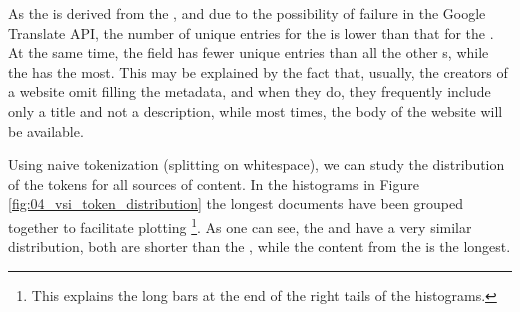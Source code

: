 As the\translationTitle{} is derived from the \translationTitle{}, and due to the possibility of failure in the Google Translate API, the number of unique entries for the \translationTitle{} is lower than that for the \trafilaturaTitle{}.
At the same time, the \trafilaturaAbstract{} field has fewer unique entries than all the other \contentType{}s, while the \trafilaturaFulltext{} has the most. This may be explained by the fact that, usually, the creators of a website omit filling the metadata, and when they do, they frequently include only a title and not a description, while most times, the body of the website will be available. 

Using naive tokenization (splitting on whitespace), we can study the distribution of the tokens for all sources of content. In the histograms in Figure \ref{fig:04_vsi_token_distribution} the longest documents have been grouped together to facilitate plotting \footnote{This explains the long bars at the end of the right tails of the histograms.}. As one can see, the \trafilaturaTitle{} and \translationTitle{} have a very similar distribution, both are shorter than the \trafilaturaAbstract{}, while the content from the \trafilaturaFulltext{} is the longest.


